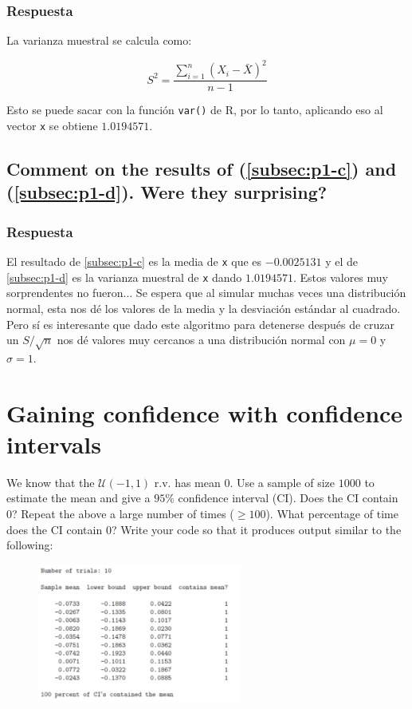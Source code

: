 \documentclass[12pt]{article}\usepackage[]{graphicx}\usepackage[]{xcolor}
\begin{document}
\subsubsection{Respuesta}

La varianza muestral se calcula como:

\[
S^{2} = \frac{\sum_{i=1}^{n} (X_{i} - \bar{X})^{2}}{n-1}
\]

Esto se puede sacar con la función \lstinline|var()| de \textsf{R}, por lo tanto, aplicando eso al vector \lstinline|x| se obtiene $1.0194571$.



\subsection{Comment on the results of (\ref{subsec:p1-c}) and (\ref{subsec:p1-d}). Were they surprising?}
\label{subsec:p1-e}

\subsubsection{Respuesta}

El resultado de \ref{subsec:p1-c} es la media de \lstinline|x| que es $-0.0025131$ y el de \ref{subsec:p1-d} es la varianza muestral de \lstinline|x| dando $1.0194571$. Estos valores muy sorprendentes no fueron... Se espera que al simular muchas veces una distribución normal, esta nos dé los valores de la media y la desviación estándar al cuadrado. Pero sí es interesante que dado este algoritmo para detenerse después de cruzar un $S / \sqrt{n}$ nos dé valores muy cercanos a una distribución normal con $\mu = 0$ y $\sigma = 1$.


\newpage

\section{Gaining confidence with confidence intervals}

We know that the $\mathcal{U}(-1, 1)$ r.v. has mean 0. Use a sample of size $1000$ to estimate the mean and give a $95\%$ confidence interval (CI). Does the CI contain 0? Repeat the above a large number of times ($\geq  100$). What percentage of time does the CI contain 0? Write your code so that it produces output similar to the following:

\begin{figure}[ht]
  \centering
  \includegraphics[width=0.6\textwidth]{img/Punto2.png}
\end{figure}
\end{document}
